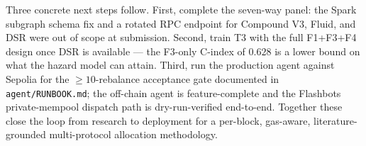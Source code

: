 Three concrete next steps follow.  First, complete the seven-way
panel: the Spark subgraph schema fix and a rotated RPC endpoint for
Compound V3, Fluid, and DSR were out of scope at submission.  Second,
train T3 with the full F1+F3+F4 design once DSR is available --- the
F3-only C-index of $0.628$ is a lower bound on what the hazard model
can attain.  Third, run the production agent against Sepolia for the
$\ge 10$-rebalance acceptance gate documented in
\texttt{agent/RUNBOOK.md}; the off-chain agent is feature-complete
and the Flashbots private-mempool dispatch path is dry-run-verified
end-to-end.  Together these close the loop from research to
deployment for a per-block, gas-aware, literature-grounded
multi-protocol allocation methodology.
